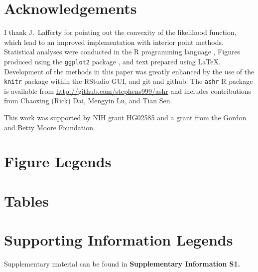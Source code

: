 \documentclass[11pt]{article}
\begin{document}
\section*{Acknowledgements}

I thank J.~Lafferty for pointing out the convexity of the likelihood function, which lead to an improved implementation with interior point methods. 
Statistical analyses were conducted in the {\sf R} programming language \cite{Rcore:2012}, Figures produced using the {\tt ggplot2} package \cite{ggplot2}, and text
prepared using \LaTeX. Development of the methods in this paper was greatly enhanced by the use of the {\tt knitr} package \cite{xie2013dynamic}  within the RStudio GUI, and 
git and github. The {\tt ashr} R package is available from \url{http://github.com/stephens999/ashr} and includes contributions 
from Chaoxing (Rick) Dai, Mengyin Lu, and Tian Sen. 

This work was supported by NIH grant HG02585 and a grant from the Gordon and Betty Moore Foundation.




\section*{Figure Legends}


\clearpage

\section*{Tables}

\section*{Supporting Information Legends}

Supplementary material can be found in {\bf Supplementary Information S1.}
\end{document}
